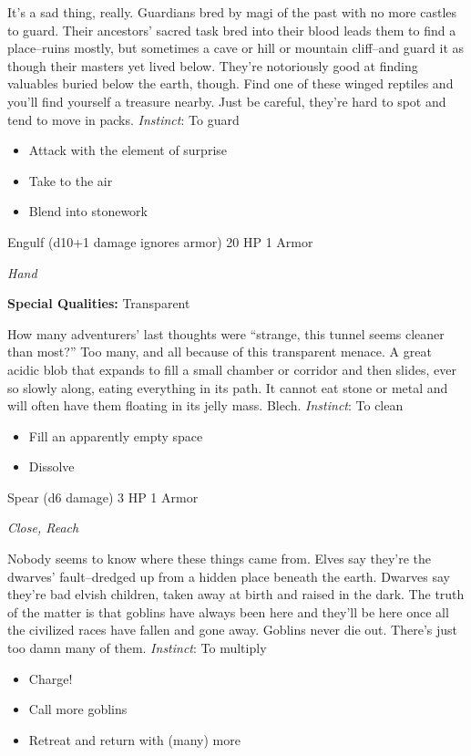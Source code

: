 \HRule
It's a sad thing, really. Guardians bred by magi of the past with no more castles to guard. Their ancestors' sacred task bred into their blood leads them to find a place--ruins mostly, but sometimes a cave or hill or mountain cliff--and guard it as though their masters yet lived below. They're notoriously good at finding valuables buried below the earth, though. Find one of these winged reptiles and you'll find yourself a treasure nearby. Just be careful, they're hard to spot and tend to move in packs. \emph{Instinct}: To guard
\begin{itemize}
\item Attack with the element of surprise
\item Take to the air
\item Blend into stonework
\end{itemize}

\newpage
\HRule
{}

Engulf (d10+1 damage ignores armor) \hspace*{\fill}20 HP 1 Armor

\emph{Hand}

\textbf{Special Qualities:}
Transparent

\HRule
How many adventurers' last thoughts were ``strange, this tunnel seems cleaner than most?'' Too many, and all because of this transparent menace. A great acidic blob that expands to fill a small chamber or corridor and then slides, ever so slowly along, eating everything in its path. It cannot eat stone or metal and will often have them floating in its jelly mass. Blech. \emph{Instinct}: To clean
\begin{itemize}
\item Fill an apparently empty space
\item Dissolve
\end{itemize}

\HRule
{}

Spear (d6 damage) \hspace*{\fill}3 HP 1 Armor

\emph{Close, Reach}

\HRule
Nobody seems to know where these things came from. Elves say they're the dwarves' fault--dredged up from a hidden place beneath the earth. Dwarves say they're bad elvish children, taken away at birth and raised in the dark. The truth of the matter is that goblins have always been here and they'll be here once all the civilized races have fallen and gone away. Goblins never die out. There's just too damn many of them. \emph{Instinct}: To multiply
\begin{itemize}
\item Charge!
\item Call more goblins
\item Retreat and return with (many) more
\end{itemize}

